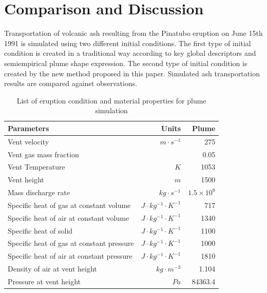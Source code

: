 \documentclass[draft,linenumbers]{agujournal2019}
\begin{document}
\section{Comparison and Discussion}

Transportation of volcanic ash resulting from the Pinatubo eruption on June 15th 1991 is simulated using two different initial conditions.
The first type of initial condition is created in a traditional way according to key global descriptors and semiempirical plume shape expression. The second type of initial condition is created by the new method proposed in this paper. Simulated ash transportation results are compared against observations.

\begin{table}[htp]
	\centering
\caption{List of eruption condition and material properties for plume simulation}		
	 \begin{tabular}{lrr}
	 \hline
	 Parameters & Units & Plume \\
	 \hline
	 Vent velocity & $m\cdot s^{-1}$ & 275 \\
	 Vent gas mass fraction & & 0.05 \\
	 Vent Temperature & $K$ & 1053 \\
	 Vent height & $m$ & 1500 \\
	 Mass discharge rate & $kg\cdot s^{-1}$ & $1.5 \times 10^9$\\
	 	Specific heat of gas at constant volume & $J \cdot kg^{-1}\cdot K^{-1}$ & 717 \\
	 Specific heat of air at constant volume & $J \cdot kg^{-1}\cdot K^{-1}$ & 1340 \\
	 	Specific heat of solid & $J \cdot kg^{-1}\cdot K^{-1}$ & 1100 \\
	 	Specific heat of gas at constant pressure & $J \cdot kg^{-1}\cdot K^{-1}$ & 1000 \\
	 	Specific heat of air at constant pressure & $J \cdot kg^{-1}\cdot K^{-1}$ & 1810 \\
	 	Density of air at vent height & $kg \cdot m^{-3}$ & 1.104 \\
	 Pressure at vent height & $Pa$ & 84363.4 \\
	 \hline
	 \end{tabular}
	 \label{tab:input_parameters_plume_simulation}
\end{table}
\end{document}
